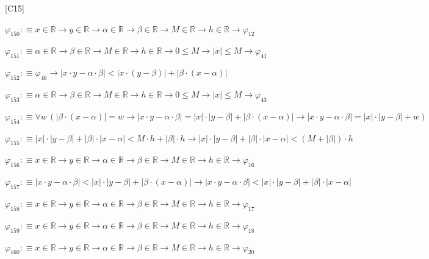 \begin{fullproof}{[C15]}
\begin{abbrevlist}
\item $\varphi_{150} :\equiv x \in \mathbb{R} \to y \in \mathbb{R} \to \alpha \in \mathbb{R} \to \beta \in \mathbb{R} \to M \in \mathbb{R} \to h \in \mathbb{R} \to \varphi_{12}$
\item $\varphi_{151} :\equiv \alpha \in \mathbb{R} \to \beta \in \mathbb{R} \to M \in \mathbb{R} \to h \in \mathbb{R} \to 0 \leq M \to \lvert x \rvert \leq M \to \varphi_{41}$
\item $\varphi_{152} :\equiv \varphi_{46} \to \lvert x \cdot y - \alpha \cdot \beta \rvert < \lvert x \cdot (y - \beta) \rvert + \lvert \beta \cdot (x - \alpha) \rvert$
\item $\varphi_{153} :\equiv \alpha \in \mathbb{R} \to \beta \in \mathbb{R} \to M \in \mathbb{R} \to h \in \mathbb{R} \to 0 \leq M \to \lvert x \rvert \leq M \to \varphi_{43}$
\item $\varphi_{154} :\equiv \forall w\,(\lvert \beta \cdot (x - \alpha) \rvert = w \to \lvert x \cdot y - \alpha \cdot \beta \rvert = \lvert x \rvert \cdot \lvert y - \beta \rvert + \lvert \beta \cdot (x - \alpha) \rvert \to \lvert x \cdot y - \alpha \cdot \beta \rvert = \lvert x \rvert \cdot \lvert y - \beta \rvert + w)$
\item $\varphi_{155} :\equiv \lvert x \rvert \cdot \lvert y - \beta \rvert + \lvert \beta \rvert \cdot \lvert x - \alpha \rvert < M \cdot h + \lvert \beta \rvert \cdot h \to \lvert x \rvert \cdot \lvert y - \beta \rvert + \lvert \beta \rvert \cdot \lvert x - \alpha \rvert < (M + \lvert \beta \rvert) \cdot h$
\item $\varphi_{156} :\equiv x \in \mathbb{R} \to y \in \mathbb{R} \to \alpha \in \mathbb{R} \to \beta \in \mathbb{R} \to M \in \mathbb{R} \to h \in \mathbb{R} \to \varphi_{16}$
\item $\varphi_{157} :\equiv \lvert x \cdot y - \alpha \cdot \beta \rvert < \lvert x \rvert \cdot \lvert y - \beta \rvert + \lvert \beta \cdot (x - \alpha) \rvert \to \lvert x \cdot y - \alpha \cdot \beta \rvert < \lvert x \rvert \cdot \lvert y - \beta \rvert + \lvert \beta \rvert \cdot \lvert x - \alpha \rvert$
\item $\varphi_{158} :\equiv x \in \mathbb{R} \to y \in \mathbb{R} \to \alpha \in \mathbb{R} \to \beta \in \mathbb{R} \to M \in \mathbb{R} \to h \in \mathbb{R} \to \varphi_{17}$
\item $\varphi_{159} :\equiv x \in \mathbb{R} \to y \in \mathbb{R} \to \alpha \in \mathbb{R} \to \beta \in \mathbb{R} \to M \in \mathbb{R} \to h \in \mathbb{R} \to \varphi_{18}$
\item $\varphi_{160} :\equiv x \in \mathbb{R} \to y \in \mathbb{R} \to \alpha \in \mathbb{R} \to \beta \in \mathbb{R} \to M \in \mathbb{R} \to h \in \mathbb{R} \to \varphi_{20}$

\end{abbrevlist}
\end{fullproof}
